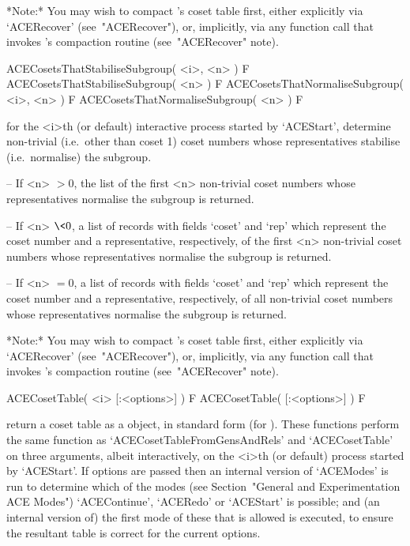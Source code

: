 *Note:*
You may wish to compact {\ACE}'s coset table first, either  explicitly
via `ACERecover' (see~"ACERecover"), or, implicitly, via any  function
call that invokes {\ACE}'s compaction routine (see~"ACERecover" note).

\>ACECosetsThatStabiliseSubgroup( <i>, <n> ) F
\>ACECosetsThatStabiliseSubgroup( <n> ) F
\>ACECosetsThatNormaliseSubgroup( <i>, <n> ) F
\>ACECosetsThatNormaliseSubgroup( <n> ) F

for the <i>th (or  default)  interactive  {\ACE}  process  started  by
`ACEStart', determine non-trivial  (i.e.~other  than  coset  1)  coset
numbers whose representatives stabilise (i.e.~normalise) the subgroup.

\beginlist

\item{--} If <n> $> 0$, the list of the first  <n>  non-trivial  coset
numbers whose representatives normalise the subgroup is returned.

\item{--} If <n> $\< 0$, a list of records  with  fields  `coset'  and
`rep'  which  represent  the  coset  number  and   a   representative,
respectively,  of  the  first  <n>  non-trivial  coset  numbers  whose
representatives normalise the subgroup is returned.

\item{--} If <n> $= 0$, a list of  records  with  fields  `coset'  and
`rep'  which  represent  the  coset  number  and   a   representative,
respectively, of all non-trivial coset numbers  whose  representatives
normalise the subgroup is returned.

\endlist

*Note:*
You may wish to compact {\ACE}'s coset table first, either  explicitly
via `ACERecover' (see~"ACERecover"), or, implicitly, via any  function
call that invokes {\ACE}'s compaction routine (see~"ACERecover" note).

\enditems


\beginitems

\>ACECosetTable( <i> [:<options>] ) F
\>ACECosetTable( [:<options>] ) F

return a coset table  as  a  {\GAP}  object,  in  standard  form  (for
{\GAP}).   These   functions   perform   the    same    function    as
`ACECosetTableFromGensAndRels' and `ACECosetTable' on three arguments,
albeit interactively, on the <i>th (or  default)  process  started  by
`ACEStart'.  If  options  are  passed  then  an  internal  version  of
`ACEModes'  is  run   to   determine   which   of   the   modes   (see
Section~"General  and  Experimentation  ACE   Modes")   `ACEContinue',
`ACERedo' or `ACEStart' is possible; and (an internal version of)  the
first mode of these  that  is  allowed  is  executed,  to  ensure  the
resultant table is correct for the current options.


